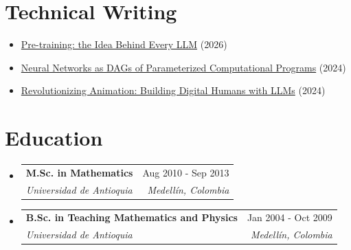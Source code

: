 \documentclass[letterpaper,10pt]{article}
\makeatletter
\newcommand{\resumeSubheading}[4]{
  \vspace{-2pt}
  \item[]
  \begin{tabular*}{\textwidth}{@{\extracolsep{\fill}}l r}
    \textbf{#1} & #2 \\
    \textit{#3} & \textit{#4} \\
  \end{tabular*}
  \vspace{-5pt}
}
\makeatother
\begin{document}
\section{Technical Writing}
\begin{itemize}[leftmargin=*, itemsep=0pt]
    \item \href{https://www.asanchezyali.com}{Pre-training: the Idea Behind Every LLM} (2026)
    \item \href{https://www.asanchezyali.com/blog/en/differentiable-programming/20240923DifferentiablePrograms}{Neural Networks as DAGs of Parameterized Computational Programs} (2024)
    \item \href{https://monadical.com/posts/build-a-digital-human-with-large-language-models.html}{Revolutionizing Animation: Building Digital Humans with LLMs} (2024)
\end{itemize}

\section{Education}
\begin{itemize}[leftmargin=0pt, itemindent=0pt, label={}]
\resumeSubheading
{M.Sc. in Mathematics}{Aug 2010 - Sep 2013}
{Universidad de Antioquia}{Medell\'in, Colombia}
\resumeSubheading
{B.Sc. in Teaching Mathematics and Physics}{Jan 2004 - Oct 2009}
{Universidad de Antioquia}{Medell\'in, Colombia}
\end{itemize}
\end{document}
